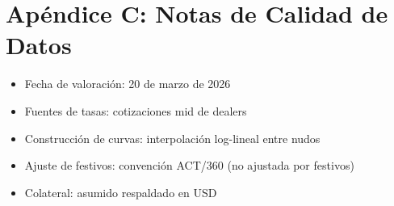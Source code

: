 \section*{Apéndice C: Notas de Calidad de Datos}
\begin{itemize}
    \item Fecha de valoración: 20 de marzo de 2026
    \item Fuentes de tasas: cotizaciones mid de dealers
    \item Construcción de curvas: interpolación log-lineal entre nudos
    \item Ajuste de festivos: convención ACT/360 (no ajustada por festivos)
    \item Colateral: asumido respaldado en USD
\end{itemize}
